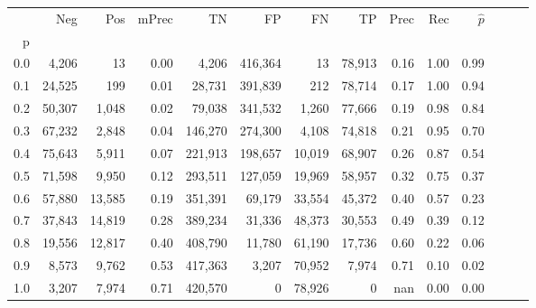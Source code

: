 \begin{tabular}{rrrrrrrrrrrrrr}
\toprule
{} &     Neg &     Pos & mPrec &       TN &       FP &      FN &      TP &  Prec &   Rec & $\hat{p}$ \\
p   &         &         &       &          &          &         &         &       &       &           \\
\midrule
0.0 &   4,206 &      13 &  0.00 &    4,206 &  416,364 &      13 &  78,913 &  0.16 &  1.00 &      0.99 \\
0.1 &  24,525 &     199 &  0.01 &   28,731 &  391,839 &     212 &  78,714 &  0.17 &  1.00 &      0.94 \\
0.2 &  50,307 &   1,048 &  0.02 &   79,038 &  341,532 &   1,260 &  77,666 &  0.19 &  0.98 &      0.84 \\
0.3 &  67,232 &   2,848 &  0.04 &  146,270 &  274,300 &   4,108 &  74,818 &  0.21 &  0.95 &      0.70 \\
0.4 &  75,643 &   5,911 &  0.07 &  221,913 &  198,657 &  10,019 &  68,907 &  0.26 &  0.87 &      0.54 \\
0.5 &  71,598 &   9,950 &  0.12 &  293,511 &  127,059 &  19,969 &  58,957 &  0.32 &  0.75 &      0.37 \\
0.6 &  57,880 &  13,585 &  0.19 &  351,391 &   69,179 &  33,554 &  45,372 &  0.40 &  0.57 &      0.23 \\
0.7 &  37,843 &  14,819 &  0.28 &  389,234 &   31,336 &  48,373 &  30,553 &  0.49 &  0.39 &      0.12 \\
0.8 &  19,556 &  12,817 &  0.40 &  408,790 &   11,780 &  61,190 &  17,736 &  0.60 &  0.22 &      0.06 \\
0.9 &   8,573 &   9,762 &  0.53 &  417,363 &    3,207 &  70,952 &   7,974 &  0.71 &  0.10 &      0.02 \\
1.0 &   3,207 &   7,974 &  0.71 &  420,570 &        0 &  78,926 &       0 &   nan &  0.00 &      0.00 \\
\bottomrule
\end{tabular}
